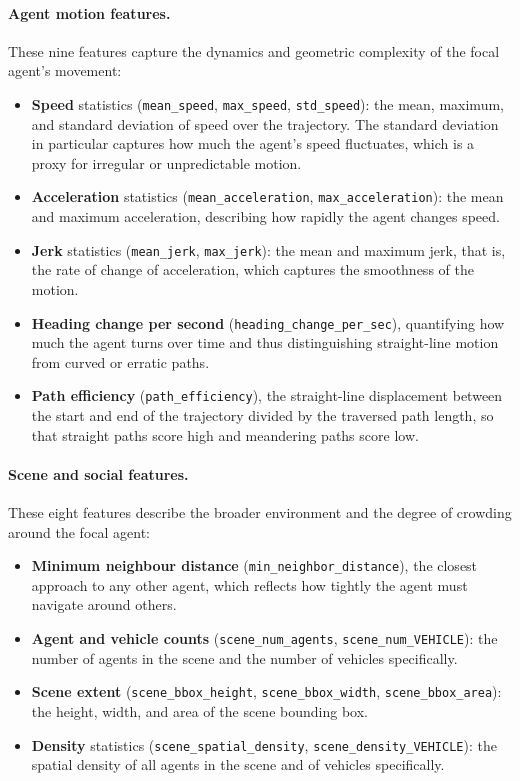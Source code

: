 \documentclass[12pt]{article}
\begin{document}
\paragraph{Agent motion features.} These nine features capture the dynamics and geometric complexity of the focal agent's movement:
\begin{itemize}
  \item \textbf{Speed} statistics (\texttt{mean\_speed}, \texttt{max\_speed}, \texttt{std\_speed}): the mean, maximum, and standard deviation of speed over the trajectory. The standard deviation in particular captures how much the agent's speed fluctuates, which is a proxy for irregular or unpredictable motion.
  \item \textbf{Acceleration} statistics (\texttt{mean\_acceleration}, \texttt{max\_acceleration}): the mean and maximum acceleration, describing how rapidly the agent changes speed.
  \item \textbf{Jerk} statistics (\texttt{mean\_jerk}, \texttt{max\_jerk}): the mean and maximum jerk, that is, the rate of change of acceleration, which captures the smoothness of the motion.
  \item \textbf{Heading change per second} (\texttt{heading\_change\_per\_sec}), quantifying how much the agent turns over time and thus distinguishing straight-line motion from curved or erratic paths.
  \item \textbf{Path efficiency} (\texttt{path\_efficiency}), the straight-line displacement between the start and end of the trajectory divided by the traversed path length, so that straight paths score high and meandering paths score low.
\end{itemize}

\paragraph{Scene and social features.} These eight features describe the broader environment and the degree of crowding around the focal agent:
\begin{itemize}
  \item \textbf{Minimum neighbour distance} (\texttt{min\_neighbor\_distance}), the closest approach to any other agent, which reflects how tightly the agent must navigate around others.
  \item \textbf{Agent and vehicle counts} (\texttt{scene\_num\_agents}, \texttt{scene\_num\_VEHICLE}): the number of agents in the scene and the number of vehicles specifically.
  \item \textbf{Scene extent} (\texttt{scene\_bbox\_height}, \texttt{scene\_bbox\_width}, \texttt{scene\_bbox\_area}): the height, width, and area of the scene bounding box.
  \item \textbf{Density} statistics (\texttt{scene\_spatial\_density}, \texttt{scene\_density\_VEHICLE}): the spatial density of all agents in the scene and of vehicles specifically.
\end{itemize}
\end{document}
